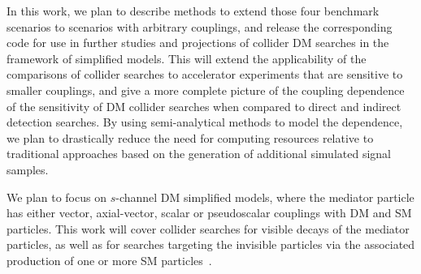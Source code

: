 \documentclass[a4paper,11pt,notoc]{article}
\begin{document}
In this work, we plan to describe methods to extend those four benchmark scenarios to scenarios with arbitrary couplings, and release the corresponding code for use in further studies and projections of collider DM searches in the framework of simplified models. This will extend the applicability of the comparisons of collider searches to accelerator experiments that are sensitive to smaller couplings, and give a more complete picture of the coupling dependence of the sensitivity of DM collider searches when compared to direct and indirect detection searches. By using semi-analytical methods to model the dependence, we plan to drastically reduce the need for computing resources relative to traditional approaches based on the generation of additional simulated signal samples.

We plan to focus on $s$-channel DM simplified models, where the mediator particle has either vector, axial-vector, scalar or pseudoscalar couplings with DM and SM particles. This work will cover collider searches for visible decays of the mediator particles, as well as for searches targeting the invisible particles via the associated production of one or more SM particles~\cite{ATL-PHYS-PUB-2020-021,CMSSummary}.



\end{document}
